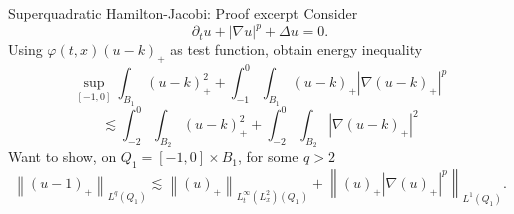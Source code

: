 \documentclass{beamer}
\newcommand{\eps}{\varepsilon}
\newcommand{\norm}[1]{\left\lVert#1\right\rVert}
\newcommand{\paren}[1]{\left( #1 \right)}
\newcommand{\abs}[1]{\left\lvert #1 \right\rvert}
\newcommand{\del}{\partial}
\newcommand{\grad}{\nabla}
\newcommand{\Laplace}{\Delta}
\begin{document}

\begin{frame}{Superquadratic Hamilton-Jacobi: Proof excerpt}
\pause
Consider
\[ \del_t u + \abs{\grad u}^p + \Laplace u = 0. \]
\pause
Using $\varphi(t,x) (u-k)_+$ as test function, obtain energy inequality
\[ \sup_{[-1,0]} \int_{B_1} (u-k)_+^2 + \int_{-1}^0 \int_{B_1} (u-k)_+ \abs{\grad (u-k)_+}^p \]
\[ \lesssim \int_{-2}^0 \int_{B_2} (u-k)_+^2 + \int_{-2}^0 \int_{B_2} \abs{\grad (u-k)_+}^2 \]
\pause
Want to show, on $Q_1 = [-1,0]\times B_1$, for some $q > 2$
\[ \norm{(u-1)_+}_{L^q(Q_1)} \lesssim \norm{(u)_+}_{L^\infty_t(L^2_x)(Q_1)} + \norm{(u)_+ |\grad (u)_+|^p}_{L^1(Q_1)}. \]

\end{frame}




\end{document}
